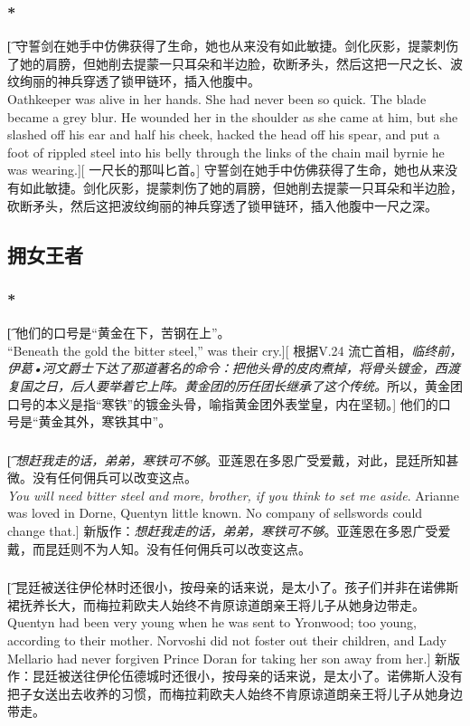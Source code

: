 \documentclass[12pt,a4paper]{article}
\begin{document}
\subsubsection{\color{red}*}\t[
	守誓剑在她手中仿佛获得了生命，她也从来没有如此敏捷。剑化灰影，提蒙刺伤了她的肩膀，但她削去提蒙一只耳朵和半边脸，砍断矛头，然后这把一尺之长、波纹绚丽的神兵穿透了锁甲链环，插入他腹中。\\
	Oathkeeper was alive in her hands. She had never been so quick. The blade became a grey blur. He wounded her in the shoulder as she came at him, but she slashed off his ear and half his cheek, hacked the head off his spear, and put a foot of rippled steel into his belly through the links of the chain mail byrnie he was wearing.][
	一尺长的那叫匕首。]
	守誓剑在她手中仿佛获得了生命，她也从来没有如此敏捷。剑化灰影，提蒙刺伤了她的肩膀，但她削去提蒙一只耳朵和半边脸，砍断矛头，然后这把波纹绚丽的神兵穿透了锁甲链环，插入他腹中一尺之深。
	
\subsection{拥女王者}
\subsubsection{\color{red}*}\t[
	他们的口号是“黄金在下，苦钢在上”。\\
	“Beneath the gold the bitter steel,” was their cry.][
	根据V.24 流亡首相，\emph{临终前，伊葛•河文爵士下达了那道著名的命令：把他头骨的皮肉煮掉，将骨头镀金，西渡复国之日，后人要举着它上阵。黄金团的历任团长继承了这个传统。}所以，黄金团口号的本义是指“寒铁”的镀金头骨，喻指黄金团外表堂皇，内在坚韧。]
	他们的口号是“黄金其外，寒铁其中”。

\subsubsection{}\t[
	\emph{想赶我走的话，弟弟，寒铁可不够}。亚莲恩在多恩广受爱戴，对此，昆廷所知甚微。没有任何佣兵可以改变这点。\\
	\emph{You will need bitter steel and more, brother, if you think to set me aside}. Arianne was loved in Dorne, Quentyn little known. No company of sellswords could change that.]
	新版作：\emph{想赶我走的话，弟弟，寒铁可不够}。亚莲恩在多恩广受爱戴，而昆廷则不为人知。没有任何佣兵可以改变这点。
	
\subsubsection{}\t[
	昆廷被送往伊伦林时还很小，按母亲的话来说，是太小了。孩子们并非在诺佛斯裙抚养长大，而梅拉莉欧夫人始终不肯原谅道朗亲王将儿子从她身边带走。\\
	Quentyn had been very young when he was sent to Yronwood; too young, according to their mother. Norvoshi did not foster out their children, and Lady Mellario had never forgiven Prince Doran for taking her son away from her.]
	新版作：昆廷被送往伊伦伍德城时还很小，按母亲的话来说，是太小了。诺佛斯人没有把子女送出去收养的习惯，而梅拉莉欧夫人始终不肯原谅道朗亲王将儿子从她身边带走。
	
\end{document}
